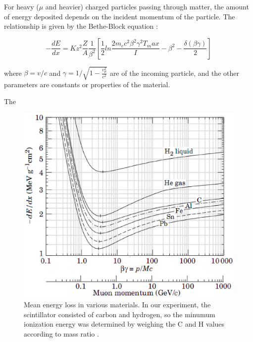 

For heavy ($\mu$ and heavier) charged particles passing through
matter, the amount of energy deposited depends on the incident
momentum of the particle. The relationship is given by the Bethe-Block
equation \cite{bichsel}:

\begin{equation}
-\frac{dE}{dx} = Kz^2\frac{Z}{A}\frac{1}{\beta^2}\left[\frac{1}{2}ln\frac{2m_ec^2\beta^2\gamma^2T_max}{I} - \beta^2 - \frac{\delta(\beta\gamma)}{2}\right]
\end{equation}

where $\beta = v/c$ and $\gamma = 1/\sqrt{1 - \frac{v_{\mu}^2}{c^2}}$
are of the incoming particle, and the other parameters are constants
or properties of the material.

The 

\begin{figure}[h]
\begin{center}
\includegraphics[width = 140mm]{figures/energy_loss.eps}
\caption{\small{Mean energy loss in various materials. In our
experiment, the scintillator consisted of carbon and hydrogen, so the
minumum ionization energy was determined by weighing the C and H
values according to mass ratio \cite{bichsel}.}}
\label{energy_loss}
\end{center}
\end{figure}
